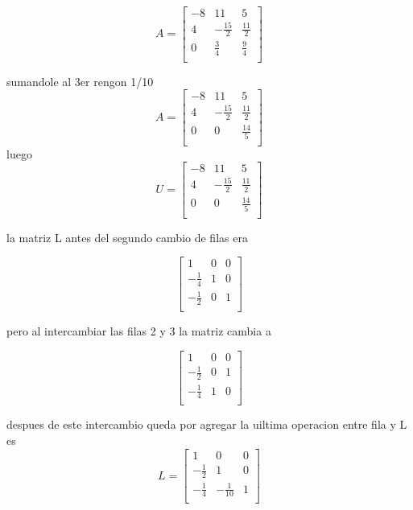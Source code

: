 \documentclass{article}
\begin{document}
\[
    A=
    \begin{bmatrix}
        -8 & 11  & 5   \\
        4 & -\frac{15}{2} & \frac{11}{2}   \\
        0 & \frac{3}{4}  & \frac{9}{4}   \\
    \end{bmatrix}
\]

    sumandole al 3er rengon 1/10
\[
    A=
    \begin{bmatrix}
        -8 & 11  & 5   \\
        4 & -\frac{15}{2} & \frac{11}{2}   \\
        0 & 0  & \frac{14}{5}   \\
    \end{bmatrix}
\]
luego
\[
    U=
    \begin{bmatrix}
        -8 & 11  & 5   \\
        4 & -\frac{15}{2} & \frac{11}{2}   \\
        0 & 0  & \frac{14}{5}   \\
    \end{bmatrix}
\]

la matriz L antes del segundo cambio de filas era

\[
    \begin{bmatrix}
        1 & 0  & 0   \\
        -\frac{1}{4} & 1 & 0   \\
        -\frac{1}{2} & 0  & 1   \\
    \end{bmatrix}
\]

pero al intercambiar las filas 2 y 3 la matriz cambia a

\[
    \begin{bmatrix}
        1 & 0  & 0   \\
        -\frac{1}{2} & 0  & 1   \\
        -\frac{1}{4} & 1 & 0   \\
    \end{bmatrix}
\]

despues de este intercambio queda por agregar la uiltima operacion entre fila
y L es 
\[
    L =
    \begin{bmatrix}
        1 & 0  & 0   \\
        -\frac{1}{2} & 1 & 0   \\
        -\frac{1}{4} & -\frac{1}{10}  & 1   \\
    \end{bmatrix}
\]
\end{document}
